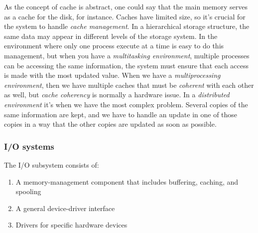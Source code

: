 \documentclass{article}
\begin{document}
As the concept of cache is abstract, one could say that the main memory serves as a cache for the disk, for instance.
Caches have limited size, so it's crucial for the system to handle \emph{cache management}. In a hierarchical storage structure, the same data may appear in different levels of the storage system. In the environment where only one process execute at a time is easy to do this management, but when you have a \emph{multitasking environment}, multiple processes can be accessing the same information, the system must ensure that each access is made with the most updated value. When we have a \emph{multiprocessing environment}, then we have multiple caches that must be \emph{coherent} with each other as well, but \emph{cache coherency} is normally a hardware issue. In a \emph{distributed environment} it's when we have the most complex problem. Several copies of the same information are kept, and we have to handle an update in one of those copies in a way that the other copies are updated as soon as possible.

\subsubsection{I/O systems}
The I/O subsystem consists of:

\begin{enumerate}
  \item A memory-management component that includes buffering, caching, and spooling
  \item A general device-driver interface
  \item Drivers for specific hardware devices
\end{enumerate}
\end{document}
